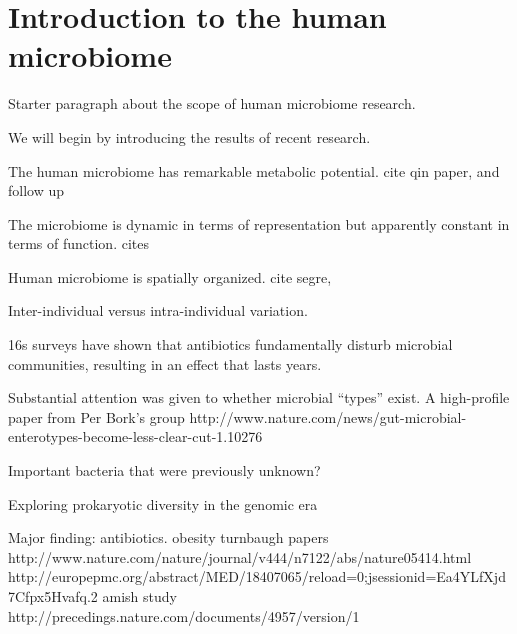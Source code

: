 \documentclass{amsart}
\newcommand{\notforarxiv}[1]{}
\begin{document}
\notforarxiv{
\noindent (Keywords: human microbiome; microbial ecology; phylogenetic methods; review)\\
\vspace{1.5in}
}

\section{Introduction to the human microbiome}

Starter paragraph about the scope of human microbiome research.

We will begin by introducing the results of recent research.

The human microbiome has remarkable metabolic potential.
cite qin paper, and follow up

The microbiome is dynamic in terms of representation but apparently constant in terms of function.
cites

Human microbiome is spatially organized.
cite segre,

Inter-individual versus intra-individual variation.

16s surveys have shown that antibiotics fundamentally disturb microbial communities, resulting in an effect that lasts years.
\cite{jernberg2007long,dethlefsen2008pervasive,jakobsson2010short,dethlefsen2011incomplete}

Substantial attention was given to whether microbial ``types'' exist.
A high-profile paper from Per Bork's group
http://www.nature.com/news/gut-microbial-enterotypes-become-less-clear-cut-1.10276

Important bacteria that were previously unknown?

\cite{hugenholtz2002review}
{{E}xploring prokaryotic diversity in the genomic era}


Major finding: antibiotics.
\cite{dethlefsen2008pervasive,dethlefsen2011incomplete,jakobsson2010short,jernberg2007long}
obesity
turnbaugh papers
http://www.nature.com/nature/journal/v444/n7122/abs/nature05414.html
http://europepmc.org/abstract/MED/18407065/reload=0;jsessionid=Ea4YLfXjd7Cfpx5Hvafq.2
amish study
http://precedings.nature.com/documents/4957/version/1
\end{document}
